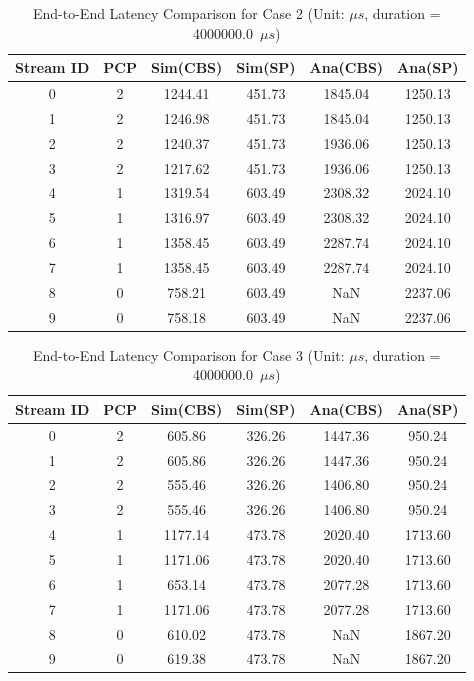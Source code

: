 \begin{table}[H]
    \centering
    \caption{End-to-End Latency Comparison for Case 2 (Unit: $\mu s$, duration = 4000000.0~$\mu s$)}
    \label{tab:case2}
    \begin{tabular}{cccccc}
        \toprule
        \textbf{Stream ID} & \textbf{PCP} & \textbf{Sim(CBS)} & \textbf{Sim(SP)} & \textbf{Ana(CBS)} & \textbf{Ana(SP)} \\
        \midrule
        0 & 2 & 1244.41 & 451.73 & 1845.04 & 1250.13 \\
        1 & 2 & 1246.98 & 451.73 & 1845.04 & 1250.13 \\
        2 & 2 & 1240.37 & 451.73 & 1936.06 & 1250.13 \\
        3 & 2 & 1217.62 & 451.73 & 1936.06 & 1250.13 \\
        \midrule
        4 & 1 & 1319.54 & 603.49 & 2308.32 & 2024.10 \\
        5 & 1 & 1316.97 & 603.49 & 2308.32 & 2024.10 \\
        6 & 1 & 1358.45 & 603.49 & 2287.74 & 2024.10 \\
        7 & 1 & 1358.45 & 603.49 & 2287.74 & 2024.10 \\
        \midrule
        8 & 0 & 758.21 & 603.49 & NaN & 2237.06 \\
        9 & 0 & 758.18 & 603.49 & NaN & 2237.06 \\
        \bottomrule
    \end{tabular}
\end{table}

\begin{table}[H]
    \centering
    \caption{End-to-End Latency Comparison for Case 3 (Unit: $\mu s$, duration = 4000000.0~$\mu s$)}
    \label{tab:case3}
    \begin{tabular}{cccccc}
        \toprule
        \textbf{Stream ID} & \textbf{PCP} & \textbf{Sim(CBS)} & \textbf{Sim(SP)} & \textbf{Ana(CBS)} & \textbf{Ana(SP)} \\
        \midrule
        0 & 2 & 605.86 & 326.26 & 1447.36 & 950.24 \\
        1 & 2 & 605.86 & 326.26 & 1447.36 & 950.24 \\
        2 & 2 & 555.46 & 326.26 & 1406.80 & 950.24 \\
        3 & 2 & 555.46 & 326.26 & 1406.80 & 950.24 \\
        \midrule
        4 & 1 & 1177.14 & 473.78 & 2020.40 & 1713.60 \\
        5 & 1 & 1171.06 & 473.78 & 2020.40 & 1713.60 \\
        6 & 1 & 653.14 & 473.78 & 2077.28 & 1713.60 \\
        7 & 1 & 1171.06 & 473.78 & 2077.28 & 1713.60 \\
        \midrule
        8 & 0 & 610.02 & 473.78 & NaN & 1867.20 \\
        9 & 0 & 619.38 & 473.78 & NaN & 1867.20 \\
        \bottomrule
    \end{tabular}
\end{table}

